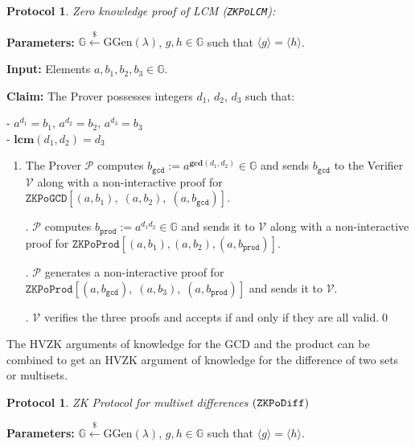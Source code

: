 \documentclass[11pt, lettersize, notitlepage, leqno, footskip=0.6cm]{article}
\newcommand{\ttt}{\texttt}
\newcommand{\bG}{\mathbb{G}}
\newcommand{\la}{\langle}
\newcommand{\ra}{\rangle}
\newcommand{\mc}{\mathcal}
\newcommand{\mb}{\mathbb}
\newcommand{\mbf}{\mathbf}
\newcommand{\mr}{\mathrm}
\newcommand{\lamb}{\lambda}
\newcommand{\mP}{\mc{P}}
\newcommand{\V}{\mc{V}}
\newcommand{\vs}{\vspace{-0.15cm}}
\newcommand{\noin}{\noindent}
\newcommand{\LCM}{\mbf{lcm}}
\newcommand{\GCD}{\mbf{gcd}}
\newtheorem{Prot}[Thm]{Protocol}
\numberwithin{equation}{section}
\begin{document}
\vspace{0.1cm}


\begin{Prot} \normalfont \hypertarget{LCM}{\textit{Zero knowledge proof of LCM}} (\verb|ZKPoLCM|):\end{Prot} \vspace{-0.3cm}

\noin \textbf{Parameters:} $\mb{G}\xleftarrow{\$} \mr{GGen}(\lamb)$,  $g,h\in \mb{G}$ such that $\la g \ra = \la h \ra$.

\noin \textbf{Input:} Elements $a, b_1, b_2, b_3 \in \mb{G}$.

\noin \textbf{Claim:} The Prover possesses integers $d_1$, $d_2$, $d_3$ such that:

\noin - $a^{d_1} = b_1$, $a^{d_2} = b_2$, $a^{d_3} = b_3$\\
\noin - $\LCM(d_1, d_2) = d_3$
 

\begin{enumerate}[wide, labelwidth=!, labelindent=0pt]\vs \item The Prover $\mP$ computes $b_{\ttt{gcd}}:= a^{\GCD(d_1,d_2)}\in \bG$ and sends $b_{\ttt{gcd}}$ to the Verifier $\V$ along with a non-interactive proof for $\ttt{ZKPoGCD}[(a,b_1),\;(a,b_2),\;(a,b_{\ttt{gcd}})]$.

\noin 2. $\mP$ computes $b_{\ttt{prod}}:= a^{d_1d_2}\in \bG$ and sends it to $\V$ along with a non-interactive proof for $\ttt{ZKPoProd}[(a, b_1), (a, b_2), (a,b_{\ttt{prod}})]$.

\noin 3. $\mP$ generates a non-interactive proof for $\ttt{ZKPoProd}[(a, b_{\ttt{gcd}}),\;(a, b_3),\; (a,b_{\ttt{prod}})]$ and sends it to $\V$.

\noin 4. $\V$ verifies the three proofs and accepts if and only if they are all valid.\qed \end{enumerate}




\noin The HVZK arguments of knowledge for the GCD and the product can be combined to get an HVZK argument of knowledge for the difference of two sets or multisets.

\begin{Prot} ZK Protocol for multiset differences $(\tt{ZKPoDiff})$\end{Prot} \vspace{-0.3cm}

\noin \textbf{Parameters:} $\mb{G}\xleftarrow{\$} \mr{GGen}(\lamb)$,  $g,h\in \mb{G}$ such that $\la g \ra = \la h \ra$.
\end{document}
